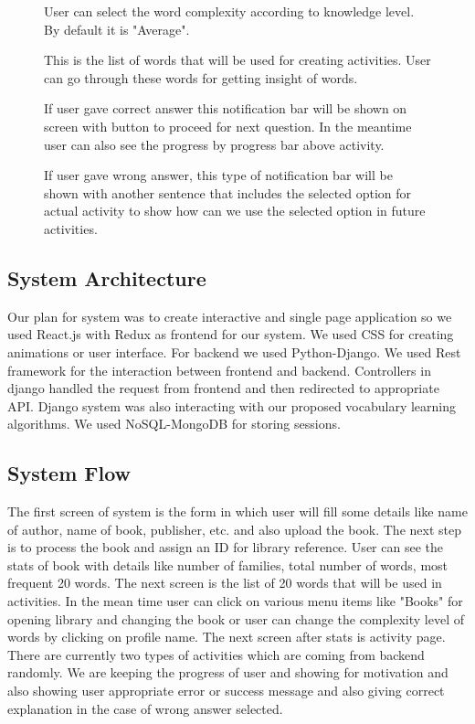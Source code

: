 \documentclass[11pt,a4paper]{article}
\begin{document}
\begin{figure}
\begin{tcbraster}[raster columns=1, enhanced, blankest]
\caption{User can select the word complexity according to knowledge level. By default it is "Average".}


\caption{This is the list of words that will be used for creating activities. User can go through these words for getting insight of words.}

\caption{If user gave correct answer this notification bar will be shown on screen with button to proceed for next question. In the meantime user can also see the progress by progress bar above activity.}

\caption{If user gave wrong answer, this type of notification bar will be shown with another sentence that includes the selected option for actual activity to show how can we use the selected option in future activities.}
\end{tcbraster}
\end{figure}




\subsection{System Architecture}
Our plan for system was to create interactive and single page application so we used React.js with Redux as frontend for our system. We used CSS for creating animations or user interface. For backend we used Python-Django. We used Rest framework for the interaction between frontend and backend. Controllers in django handled the request from frontend and then redirected to appropriate API. Django system was also interacting with our proposed vocabulary learning algorithms. We used NoSQL-MongoDB for storing sessions.   



\subsection{System Flow}
The first screen of system is the form in which user will fill some details like name of author, name of book, publisher, etc. and also upload the book. The next step is to process the book and assign an ID for library reference. User can see the stats of book with details like number of families, total number of words, most frequent 20 words. 
The next screen is the list of 20 words that will be used in activities. In the mean time user can click on various menu items like "Books" for opening library and changing the book or user can change the complexity level of words by clicking on profile name. The next screen after stats is activity page. There are currently two types of activities which are coming from backend randomly. We are keeping the progress of user and showing for motivation and also showing user appropriate error or success message and also giving correct explanation in the case of wrong answer selected. 
\end{document}
